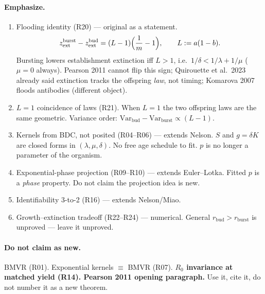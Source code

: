 \documentclass[11pt,a4paper]{report}
\begin{document}
\paragraph{Emphasize.}
\begin{enumerate}
\item Flooding identity (R20) --- original as a statement.
\[
z_{\mathrm{ext}}^{\mathrm{burst}}-z_{\mathrm{ext}}^{\mathrm{bud}}
=(L-1)\Bigl(\frac{1}{m}-1\Bigr),\qquad L:=a(1-b).
\]
Bursting lowers establishment extinction iff \(L>1\), i.e.\
\(1/\delta<1/\lambda+1/\mu\) (\(\mu=0\) always). Pearson 2011 cannot flip
this sign; Quirouette et al.\ 2023 already said extinction tracks the
offspring \emph{law}, not timing; Komarova 2007 floods antibodies
(different object).
\item \(L=1\) coincidence of laws (R21). When \(L=1\) the two offspring
  laws are the same geometric. Variance order:
  \(\mathrm{Var}_{\mathrm{bud}}-\mathrm{Var}_{\mathrm{burst}}\propto(L-1)\).
\item Kernels from BDC, not posited (R04--R06) --- extends Nelson.
  \(S\) and \(g=\delta K\) are closed forms in \((\lambda,\mu,\delta)\).
  No free age schedule to fit. \(p\) is no longer a parameter of the
  organism.
\item Exponential-phase projection (R09--R10) --- extends Euler--Lotka.
  Fitted \(p\) is a \emph{phase} property. Do not claim the projection
  idea is new.
\item Identifiability 3-to-2 (R16) --- extends Nelson/Miao.
\item Growth--extinction tradeoff (R22--R24) --- numerical. General
  \(r_{\mathrm{bud}}>r_{\mathrm{burst}}\) is unproved --- leave it
  unproved.
\end{enumerate}

\paragraph{Do not claim as new.}
BMVR (R01). Exponential kernels \(\equiv\) BMVR (R07). \textbf{\(R_0\)
invariance at matched yield (R14). Pearson 2011 opening paragraph.} Use
it, cite it, do not number it as a new theorem.
\end{document}
